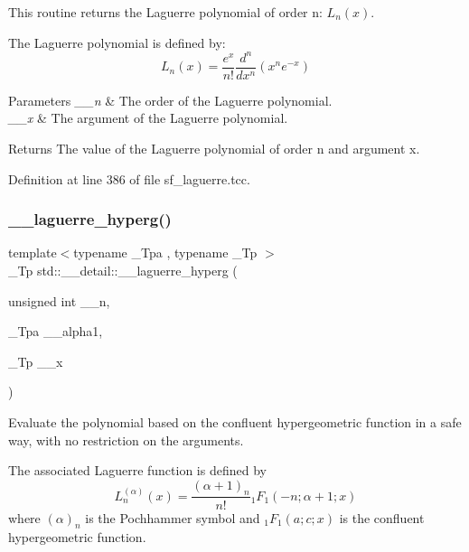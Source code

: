 This routine returns the Laguerre polynomial of order n\+: $ L_n(x) $. 

The Laguerre polynomial is defined by\+: \[ L_n(x) = \frac{e^x}{n!} \frac{d^n}{dx^n} (x^ne^{-x}) \]


\begin{DoxyParams}{Parameters}
{\em \+\_\+\+\_\+n} & The order of the Laguerre polynomial. \\
\hline
{\em \+\_\+\+\_\+x} & The argument of the Laguerre polynomial. \\
\hline
\end{DoxyParams}
\begin{DoxyReturn}{Returns}
The value of the Laguerre polynomial of order n and argument x. 
\end{DoxyReturn}


Definition at line 386 of file sf\+\_\+laguerre.\+tcc.

\mbox{\label{namespacestd_1_1____detail_a7908be328a4546d77802076196ae4396}} 
\subsubsection{\texorpdfstring{\+\_\+\+\_\+laguerre\+\_\+hyperg()}{\_\_laguerre\_hyperg()}}
{\footnotesize\ttfamily template$<$typename \+\_\+\+Tpa , typename \+\_\+\+Tp $>$ \\
\+\_\+\+Tp std\+::\+\_\+\+\_\+detail\+::\+\_\+\+\_\+laguerre\+\_\+hyperg (\begin{DoxyParamCaption}\item[{unsigned int}]{\+\_\+\+\_\+n,  }\item[{\+\_\+\+Tpa}]{\+\_\+\+\_\+alpha1,  }\item[{\+\_\+\+Tp}]{\+\_\+\+\_\+x }\end{DoxyParamCaption})}



Evaluate the polynomial based on the confluent hypergeometric function in a safe way, with no restriction on the arguments. 

The associated Laguerre function is defined by \[ L_n^{(\alpha)}(x) = \frac{(\alpha + 1)_n}{n!} {}_1F_1(-n; \alpha + 1; x) \] where $ (\alpha)_n $ is the Pochhammer symbol and $ {}_1F_1(a; c; x) $ is the confluent hypergeometric function.

